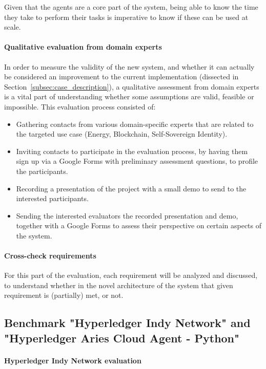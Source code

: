 Given that the agents are a core part of the system, being able to know the time they take to perform their tasks is imperative to know if these can be used at scale.

\paragraph{Qualitative evaluation from domain experts}

In order to measure the validity of the new system, and whether it can actually be considered an improvement to the current implementation (dissected in Section~\ref{subsec:case_description}), a qualitative assessment from domain experts is a vital part of understanding whether some assumptions are valid, feasible or impossible. 
This evaluation process consisted of:
\begin{itemize}
    \item Gathering contacts from various domain-specific experts that are related to the targeted use case (Energy, Blockchain, Self-Sovereign Identity).
    \item Inviting contacts to participate in the evaluation process, by having them sign up via a Google Forms with preliminary assessment questions, to profile the participants.
    \item Recording a presentation of the project with a small demo to send to the interested participants.
    \item Sending the interested evaluators the recorded presentation and demo, together with a Google Forms to assess their perspective on certain aspects of the system. 
\end{itemize}

\paragraph{Cross-check requirements} 

For this part of the evaluation, each requirement will be analyzed and discussed, to understand whether in the novel architecture of the system that given requirement is (partially) met, or not.


\subsection{Benchmark "Hyperledger Indy Network" and "Hyperledger Aries Cloud Agent - Python"}
\label{subsec:benchmark_hyperledger_indy_and_aries}

\paragraph{Hyperledger Indy Network evaluation}

